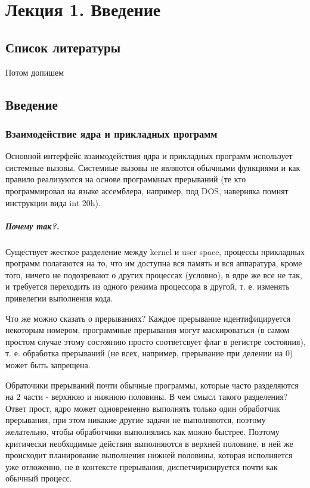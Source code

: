 \chapter{Лекция 1. Введение}

\section{Список литературы}

Потом допишем

\section{Введение}

\subsection{Взаимодействие ядра и прикладных программ}

Основной интерфейс взаимодействия ядра и прикладных программ использует системные вызовы. Системные вызовы не являются обычными
функциями и как правило реализуются на основе программных прерываний (те кто программировал на языке ассемблера, например, под DOS,
наверняка помнят инструкции вида int 20h).

\paragraph{Почему так?.} Существует жесткое разделение между kernel и user space, процессы прикладных программ полагаются на то,
что им доступна вся память и вся аппаратура, кроме того, ничего не подозревают о других процессах (условно), в ядре же все не так,
и требуется переходить из одного режима процессора в другой, т. е. изменять привелегии выполнения кода.

Что же можно сказать о прерываниях? Каждое прерывание идентифицируется некоторым номером, программные прерывания могут маскироваться
(в самом простом случае этому состоянию просто соответсвует флаг в регистре состояния), т. е. обработка прерываний (не всех, например,
прерывание при делении на 0) может быть запрещена. 

Обраточики прерываний почти обычные программы, которые часто разделяются на 2 части - верхнюю и нижнюю половины. В чем смысл такого
разделения? Ответ прост, ядро может одновременно выполнять только один обработчик прерывания, при этом никакие другие задачи не
выполняются, поэтому желательно, чтобы обработчики выполнялись как можно быстрее. Поэтому критически необходимые действия выполняются
в верхней половине, в ней же происходит планирование выполнения нижней половины, которая исполняется уже отложенно, не в контексте
прерывания, диспетчиризируется почти как обычный процесс.

